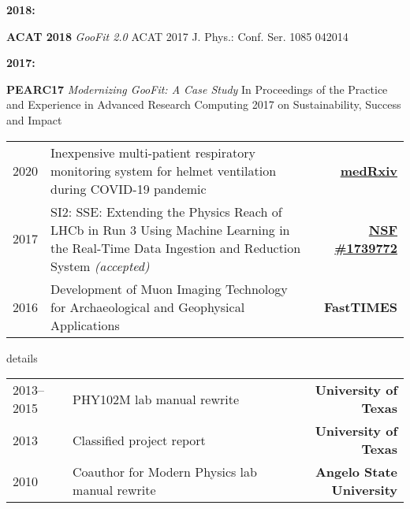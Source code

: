 \documentclass[10pt,letterpaper,english]{moderncv}
\begin{document}
\begin{minipage}[t]{.065\textwidth}
\textbf{2018:}\\
\end{minipage}%
\begin{minipage}[t]{.935\textwidth}
\textbf{ACAT 2018} \emph{GooFit 2.0} ACAT 2017 J. Phys.: Conf. Ser. 1085 042014
\end{minipage}

\begin{minipage}[t]{.065\textwidth}
\textbf{2017:}\\
\end{minipage}%
\begin{minipage}[t]{.935\textwidth}
\textbf{PEARC17} \emph{Modernizing GooFit: A Case Study} In Proceedings of the Practice and Experience in Advanced Research Computing 2017 on Sustainability, Success and Impact
\end{minipage}


\begin{tabularx}{\textwidth}{p{.8in}X>{\bfseries}r}
2020 & Inexpensive multi-patient respiratory monitoring system for helmet ventilation during COVID-19 pandemic & \href{https://doi.org/10.1101/2020.06.29.20141283}{medRxiv} \\
2017 & SI2: SSE: Extending the Physics Reach of LHCb in Run 3 Using Machine Learning in the Real-Time Data Ingestion and Reduction System  \textit{(accepted)} & \href{https://nsf.gov/awardsearch/showAward?AWD_ID=1739772}{NSF \#1739772} \\ %
2016 & Development of Muon Imaging Technology
for Archaeological and Geophysical Applications & FastTIMES \\
%
\end{tabularx}

\begin{taggedblock}{details}
\begin{tabularx}{\textwidth}{p{.8in}X>{\bfseries}r}
2013--2015 & PHY102M lab manual rewrite & University of Texas \\
2013 & Classified project report & University of Texas\\
2010 & Coauthor for Modern Physics lab manual rewrite & Angelo State University\\
\end{tabularx}
\end{taggedblock}


\end{document}
